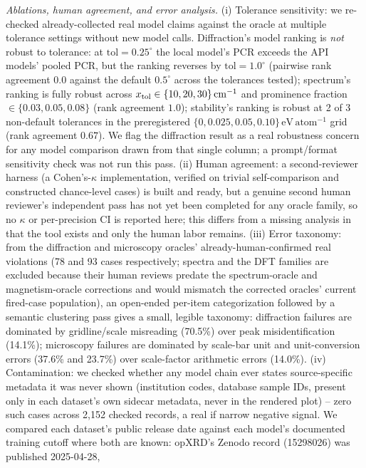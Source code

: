 \documentclass[pdflatex,sn-nature]{sn-jnl}
\begin{document}
\noindent\emph{Ablations, human agreement, and error analysis.} (i) Tolerance sensitivity:
we re-checked already-collected real model claims against the oracle at multiple tolerance
settings without new model calls. Diffraction's model ranking is \emph{not} robust to
tolerance: at $\mathrm{tol}=0.25^\circ$ the local model's PCR exceeds the API models'
pooled PCR, but the ranking reverses by $\mathrm{tol}=1.0^\circ$ (pairwise rank agreement
$0.0$ against the default $0.5^\circ$ across the tolerances tested); spectrum's ranking is
fully robust across $x_{\rm tol}\in\{10,20,30\}\,\mathrm{cm}^{-1}$ and prominence fraction
$\in\{0.03,0.05,0.08\}$ (rank agreement $1.0$); stability's ranking is robust at 2 of 3
non-default tolerances in the preregistered $\{0,0.025,0.05,0.10\}\,\mathrm{eV\,atom^{-1}}$
grid (rank agreement $0.67$). We flag the diffraction result as a real robustness concern
for any model comparison drawn from that single column; a prompt/format sensitivity check
was not run this pass. (ii) Human agreement: a second-reviewer harness (a
Cohen's-$\kappa$ implementation, verified on trivial self-comparison and constructed
chance-level cases) is built and ready, but a genuine second human reviewer's independent
pass has not yet been completed for any oracle family, so no $\kappa$ or per-precision CI
is reported here; this differs from a missing analysis in that the tool exists and only the
human labor remains. (iii) Error taxonomy: from the diffraction and microscopy oracles'
already-human-confirmed real violations (78 and 93 cases respectively; spectra and the DFT
families are excluded because their human reviews predate the spectrum-oracle and
magnetism-oracle corrections and would mismatch the corrected oracles' current fired-case
population), an open-ended per-item categorization followed by a semantic clustering pass
gives a small, legible taxonomy: diffraction failures are dominated by gridline/scale
misreading (70.5\%) over peak misidentification (14.1\%); microscopy failures are
dominated by scale-bar unit and unit-conversion errors (37.6\% and 23.7\%) over scale-factor
arithmetic errors (14.0\%). (iv) Contamination: we checked whether any model chain ever
states source-specific metadata it was never shown (institution codes, database sample
IDs, present only in each dataset's own sidecar metadata, never in the rendered plot) --
zero such cases across 2{,}152 checked records, a real if narrow negative signal. We
compared each dataset's public release date against each model's documented training
cutoff where both are known: opXRD's Zenodo record (15298026) was published 2025-04-28,
\end{document}
